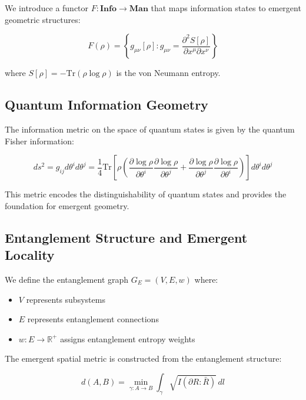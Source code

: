 \documentclass[12pt,a4paper]{article}
\begin{document}
We introduce a functor $F: \mathbf{Info} \to \mathbf{Man}$ that maps information states to emergent geometric structures:

\begin{equation}
F(\rho) = \left\{g_{\mu\nu}[\rho] : g_{\mu\nu} = \frac{\partial^2 S[\rho]}{\partial x^\mu \partial x^\nu}\right\}
\end{equation}

where $S[\rho] = -\text{Tr}(\rho \log \rho)$ is the von Neumann entropy.

\subsection{Quantum Information Geometry}

The information metric on the space of quantum states is given by the quantum Fisher information:

\begin{equation}
ds^2 = g_{ij} d\theta^i d\theta^j = \frac{1}{4} \text{Tr}\left[\rho \left(\frac{\partial \log \rho}{\partial \theta^i} \frac{\partial \log \rho}{\partial \theta^j} + \frac{\partial \log \rho}{\partial \theta^j} \frac{\partial \log \rho}{\partial \theta^i}\right)\right] d\theta^i d\theta^j
\end{equation}

This metric encodes the distinguishability of quantum states and provides the foundation for emergent geometry.

\subsection{Entanglement Structure and Emergent Locality}

We define the entanglement graph $G_E = (V, E, w)$ where:
\begin{itemize}
\item $V$ represents subsystems
\item $E$ represents entanglement connections
\item $w: E \to \mathbb{R}^+$ assigns entanglement entropy weights
\end{itemize}

The emergent spatial metric is constructed from the entanglement structure:

\begin{equation}
d(A, B) = \min_{\gamma: A \to B} \int_\gamma \sqrt{I(\partial R : \bar{R})} \, dl
\end{equation}
\end{document}
